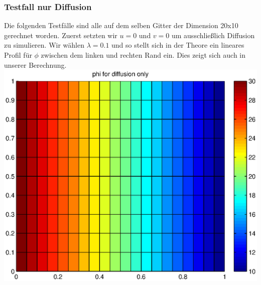 \documentclass{article}
\begin{document}
\subsubsection{Testfall nur Diffusion}
Die folgenden Testfälle sind alle auf dem selben Gitter der Dimension 20x10 gerechnet worden.
Zuerst setzten wir  $u=0$ und $v=0$ um ausschließlich Diffusion zu simulieren. Wir wählen $\lambda=0.1$ und so stellt
sich in der Theore ein lineares Profil für $\phi$ zwischen dem linken und rechten Rand ein.
Dies zeigt sich auch in unserer Berechnung. \\
\includegraphics[scale=0.4]{test/5conv/diffusiononly.eps}
 
\end{document}
